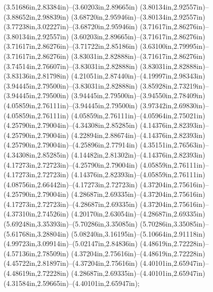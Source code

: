 (3.51686in,2.83384in)--(3.60203in,2.89665in) (3.80134in,2.92557in)--(3.88652in,2.98839in) (3.68720in,2.95946in)--(3.80134in,2.92557in) (3.77238in,3.02227in)--(3.68720in,2.95946in) (3.71617in,2.86276in)--(3.80134in,2.92557in) (3.60203in,2.89665in)--(3.71617in,2.86276in) (3.71617in,2.86276in)--(3.71722in,2.85186in) (3.63100in,2.79995in)--(3.71617in,2.86276in) (3.83031in,2.82888in)--(3.71617in,2.86276in) (3.74514in,2.76607in)--(3.83031in,2.82888in) (3.83031in,2.82888in)--(3.83136in,2.81798in) (4.21051in,2.87440in)--(4.19997in,2.98343in) (3.94445in,2.79500in)--(3.83031in,2.82888in) (3.85928in,2.73219in)--(3.94445in,2.79500in) (3.94445in,2.79500in)--(3.94550in,2.78409in) (4.05859in,2.76111in)--(3.94445in,2.79500in) (3.97342in,2.69830in)--(4.05859in,2.76111in) (4.05859in,2.76111in)--(4.05964in,2.75021in) (4.25790in,2.79004in)--(4.34308in,2.85285in) (4.14376in,2.82393in)--(4.25790in,2.79004in) (4.22894in,2.88674in)--(4.14376in,2.82393in) (4.25790in,2.79004in)--(4.25896in,2.77914in) (4.35151in,2.76563in)--(4.34308in,2.85285in) (4.14482in,2.81302in)--(4.14376in,2.82393in) (4.17273in,2.72723in)--(4.25790in,2.79004in) (4.05859in,2.76111in)--(4.17273in,2.72723in) (4.14376in,2.82393in)--(4.05859in,2.76111in) (4.08756in,2.66442in)--(4.17273in,2.72723in) (4.37204in,2.75616in)--(4.25790in,2.79004in) (4.28687in,2.69335in)--(4.37204in,2.75616in) (4.17273in,2.72723in)--(4.28687in,2.69335in) (4.37204in,2.75616in)--(4.37310in,2.74526in) (4.20170in,2.63054in)--(4.28687in,2.69335in) (5.69248in,3.35393in)--(5.70286in,3.35085in) (5.70286in,3.35085in)--(5.61768in,3.28804in) (5.08240in,3.16195in)--(5.10664in,2.91118in) (4.99723in,3.09914in)--(5.02147in,2.84836in) (4.48619in,2.72228in)--(4.57136in,2.78509in) (4.37204in,2.75616in)--(4.48619in,2.72228in) (4.45722in,2.81897in)--(4.37204in,2.75616in) (4.40101in,2.65947in)--(4.48619in,2.72228in) (4.28687in,2.69335in)--(4.40101in,2.65947in) (4.31584in,2.59665in)--(4.40101in,2.65947in);
